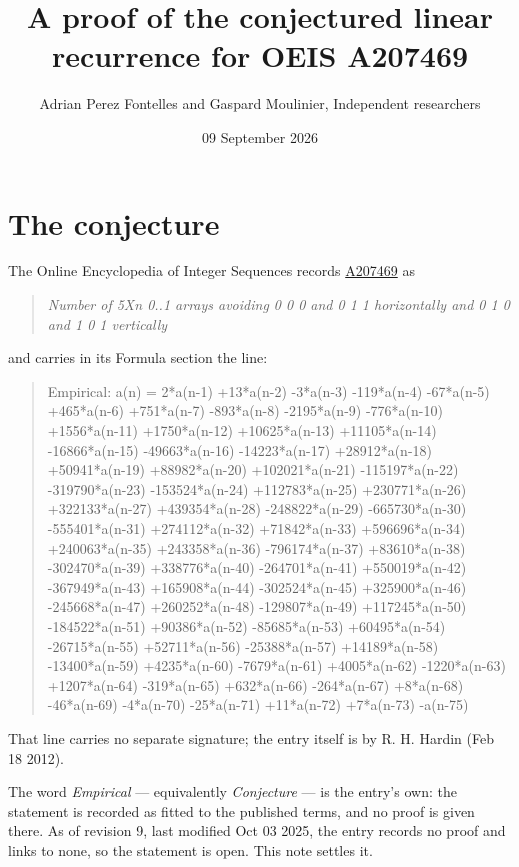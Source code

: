 \documentclass[11pt]{article}
\title{A proof of the conjectured linear recurrence for OEIS A207469}
\author{Adrian Perez Fontelles and Gaspard Moulinier, Independent researchers}
\date{09 September 2026}
\theoremstyle{definition}
\begin{document}
\maketitle
\section{The conjecture}

The Online Encyclopedia of Integer Sequences records \href{https://oeis.org/A207469}{A207469} as

\begin{quote}\itshape Number of 5Xn 0..1 arrays avoiding 0 0 0 and 0 1 1 horizontally and 0 1 0 and 1 0 1 vertically\end{quote}

and carries in its Formula section the line:

\begin{quote}\ttfamily Empirical: a(n) = 2*a(n-1) +13*a(n-2) -3*a(n-3) -119*a(n-4) -67*a(n-5) +465*a(n-6) +751*a(n-7) -893*a(n-8) -2195*a(n-9) -776*a(n-10) +1556*a(n-11) +1750*a(n-12) +10625*a(n-13) +11105*a(n-14) -16866*a(n-15) -49663*a(n-16) -14223*a(n-17) +28912*a(n-18) +50941*a(n-19) +88982*a(n-20) +102021*a(n-21) -115197*a(n-22) -319790*a(n-23) -153524*a(n-24) +112783*a(n-25) +230771*a(n-26) +322133*a(n-27) +439354*a(n-28) -248822*a(n-29) -665730*a(n-30) -555401*a(n-31) +274112*a(n-32) +71842*a(n-33) +596696*a(n-34) +240063*a(n-35) +243358*a(n-36) -796174*a(n-37) +83610*a(n-38) -302470*a(n-39) +338776*a(n-40) -264701*a(n-41) +550019*a(n-42) -367949*a(n-43) +165908*a(n-44) -302524*a(n-45) +325900*a(n-46) -245668*a(n-47) +260252*a(n-48) -129807*a(n-49) +117245*a(n-50) -184522*a(n-51) +90386*a(n-52) -85685*a(n-53) +60495*a(n-54) -26715*a(n-55) +52711*a(n-56) -25388*a(n-57) +14189*a(n-58) -13400*a(n-59) +4235*a(n-60) -7679*a(n-61) +4005*a(n-62) -1220*a(n-63) +1207*a(n-64) -319*a(n-65) +632*a(n-66) -264*a(n-67) +8*a(n-68) -46*a(n-69) -4*a(n-70) -25*a(n-71) +11*a(n-72) +7*a(n-73) -a(n-75)\end{quote}

That line carries no separate signature; the entry itself is by R. H. Hardin (Feb 18 2012).

The word {\itshape Empirical} --- equivalently {\itshape Conjecture} --- is the entry's own: the statement is recorded as fitted to the published terms, and no proof is given there. As of revision 9, last modified Oct 03 2025, the entry records no proof and links to none, so the statement is open. This note settles it.
\end{document}
